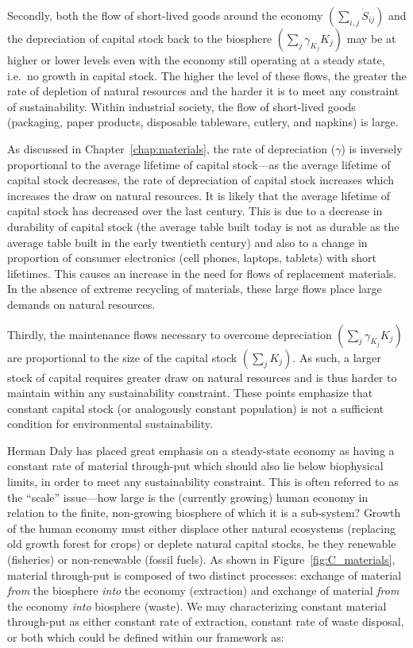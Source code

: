 Secondly,
both the flow of short-lived goods around the economy
$\left(\sum_{i,j}\dot{S}_{ij}\right)$
and the depreciation of capital stock back to the biosphere 
$\left(\sum_{j}\gamma_{K_{j}}K_{j}\right)$
may be at higher or lower levels even with the
economy still operating at a steady state,
i.e.\ no growth in capital stock.
The higher the level of these flows,
the greater the rate of depletion of
natural resources and the harder it is to
meet any constraint of sustainability.
Within industrial society,
the flow of short-lived goods 
(packaging,
paper products,
disposable tableware,
cutlery,
and napkins)
is large.

As discussed in Chapter~\ref{chap:materials},
the rate of depreciation ($\gamma$) is inversely
proportional to the average lifetime of capital stock---as
the average lifetime of capital stock decreases,
the rate of depreciation of capital stock increases which
increases the draw on natural resources.
It is likely that the average lifetime of capital stock has
decreased over the last century.
This is due to a decrease in durability of capital stock
(the average table built today is not as durable as the average table
built in the early twentieth century)
and also to a change in proportion of consumer electronics
(cell phones, laptops, tablets)
with short lifetimes.
This causes an increase in the need for flows of
replacement materials.
In the absence of extreme recycling of materials,
these large flows place large demands on
natural resources.

Thirdly,
the maintenance flows necessary to overcome
depreciation
$\left(\sum_{j}\gamma_{K_{j}}K_{j}\right)$
are proportional to the size of the capital
stock $\left(\sum_{j}K_{j}\right)$.
As such,
a larger stock of capital requires
greater draw on natural resources and is thus harder
to maintain within any sustainability constraint.
These points emphasize that constant capital stock
(or analogously constant population)
is not a sufficient condition for environmental sustainability.

Herman Daly has placed great emphasis on a steady-state
economy as having a constant rate of material through-put 
\cite{Daly1977, Daly1997}
which should also lie below biophysical limits,
in order to meet any sustainability constraint.
This is often referred to as the ``scale'' issue---how 
large is the (currently growing) human economy in relation
to the finite, non-growing biosphere of which it is a sub-system?
Growth of the human economy must either displace other natural
ecosystems (replacing old growth forest for crops)
or deplete natural capital stocks, be they 
renewable (fisheries) or 
non-renewable (fossil fuels).
As shown in Figure~\ref{fig:C_materials},
material through-put is composed of two distinct processes:
exchange of material \emph{from} the biosphere 
\emph{into} the economy (extraction)
and exchange of material \emph{from} the economy
\emph{into} biosphere (waste).
We may characterizing constant material through-put
as either constant rate of extraction, constant rate of
waste disposal, or both
which could be defined within our framework as:


